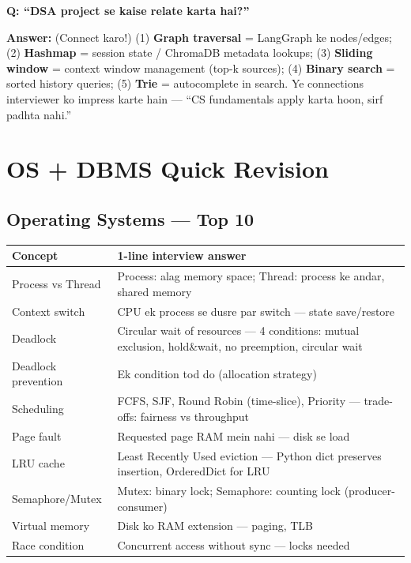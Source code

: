 \begin{interviewbox}
\textbf{Q: ``DSA project se kaise relate karta hai?''}

\textbf{Answer:} (Connect karo!) (1) \textbf{Graph traversal} = LangGraph ke nodes/edges; (2) \textbf{Hashmap} = session state / ChromaDB metadata lookups; (3) \textbf{Sliding window} = context window management (top-k sources); (4) \textbf{Binary search} = sorted history queries; (5) \textbf{Trie} = autocomplete in search. Ye connections interviewer ko impress karte hain --- ``CS fundamentals apply karta hoon, sirf padhta nahi.''
\end{interviewbox}

\section{OS + DBMS Quick Revision}

\subsection{Operating Systems --- Top 10}

\begin{longtable}{p{4.5cm} p{9.5cm}}
\toprule
\textbf{Concept} & \textbf{1-line interview answer} \\
\midrule
Process vs Thread & Process: alag memory space; Thread: process ke andar, shared memory \\
Context switch & CPU ek process se dusre par switch --- state save/restore \\
Deadlock & Circular wait of resources --- 4 conditions: mutual exclusion, hold\&wait, no preemption, circular wait \\
Deadlock prevention & Ek condition tod do (allocation strategy) \\
Scheduling & FCFS, SJF, Round Robin (time-slice), Priority --- trade-offs: fairness vs throughput \\
Page fault & Requested page RAM mein nahi --- disk se load \\
LRU cache & Least Recently Used eviction --- Python dict preserves insertion, OrderedDict for LRU \\
Semaphore/Mutex & Mutex: binary lock; Semaphore: counting lock (producer-consumer) \\
Virtual memory & Disk ko RAM extension --- paging, TLB \\
Race condition & Concurrent access without sync --- locks needed \\
\bottomrule
\end{longtable}

